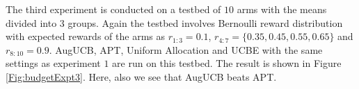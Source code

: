 	The third experiment is conducted on a testbed of $10$ arms with the means divided into $3$ groups. Again the testbed involves Bernoulli reward distribution with expected rewards of the arms as $r_{1:3}=0.1$, $r_{4:7}=\lbrace 0.35,0.45,0.55,0.65\rbrace$ and $r_{8:10}=0.9$. AugUCB, APT, Uniform Allocation and UCBE with the same settings as experiment $1$ are run on this testbed. The result is shown in Figure \ref{Fig:budgetExpt3}. Here, also we see that AugUCB beats APT.  
